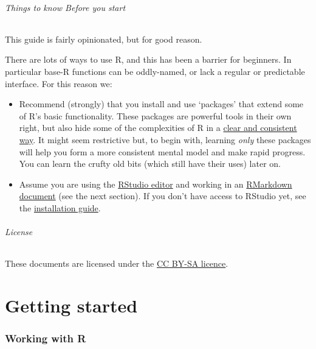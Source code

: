 \documentclass[]{article}
\let\oldparagraph\paragraph
\renewcommand{\paragraph}[1]{\oldparagraph{#1}\mbox{}}
\begin{document}
\hypertarget{things-to-know-before-you-start}{%
\paragraph{Things to know Before you start}\label{things-to-know-before-you-start}}

This guide is fairly opinionated, but for good reason.

There are lots of ways to use R, and this has been a barrier for beginners. In
particular base-R functions can be oddly-named, or lack a regular or predictable
interface. For this reason we:

\begin{itemize}
\item
  Recommend (strongly) that you install and use `packages' that extend some of
  R's basic functionality. These packages are powerful tools in their own
  right, but also hide some of the complexities of R in a
  \href{https://www.youtube.com/watch?v=K-ss_ag2k9E}{clear and consistent way}. It
  might seem restrictive but, to begin with, learning \emph{only} these packages
  will help you form a more consistent mental model and make rapid progress.
  You can learn the crufty old bits (which still have their uses) later on.
\item
  Assume you are using the \protect\hyperlink{rstudio}{RStudio editor} and working in an
  \protect\hyperlink{rmarkdown}{RMarkdown document} (see the next section). If you don't have
  access to RStudio yet, see the \href{installation.html}{installation guide}.
\end{itemize}

\hypertarget{license}{%
\paragraph{License}\label{license}}

These documents are licensed under the
\href{https://creativecommons.org/licenses/by-sa/4.0/}{CC BY-SA licence}.

\hypertarget{part-getting-started}{%
\part{Getting started}\label{part-getting-started}}

\hypertarget{r-basics}{%
\section{Working with R}\label{r-basics}}
\end{document}
